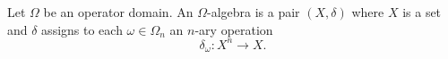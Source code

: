 Let $\Omega$ be an operator domain. An $\Omega$-algebra is a pair $(X, \delta)$ where $X$ is a set and $\delta$ assigns to each $\omega \in \Omega_n$ an $n$-ary operation
$$
\delta_\omega : X^n \longrightarrow X.
$$
